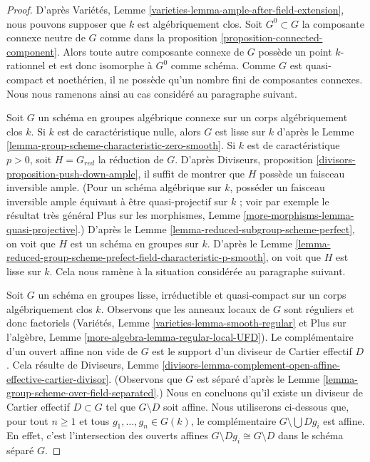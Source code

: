 \begin{proof}
D'après Variétés, Lemme \ref{varieties-lemma-ample-after-field-extension},
nous pouvons supposer que $k$ est algébriquement clos. Soit $G^0 \subset G$
la composante connexe neutre de $G$ comme dans la
proposition \ref{proposition-connected-component}.
Alors toute autre composante connexe de $G$ possède un point $k$-rationnel
et est donc isomorphe à $G^0$ comme schéma.
Comme $G$ est quasi-compact et noethérien, il ne possède qu'un nombre fini de
composantes connexes. Nous nous ramenons ainsi au cas considéré au
paragraphe suivant.

\medskip\noindent
Soit $G$ un schéma en groupes algébrique connexe sur un corps algébriquement clos
$k$. Si $k$ est de caractéristique nulle, alors $G$ est lisse sur
$k$ d'après le Lemme \ref{lemma-group-scheme-characteristic-zero-smooth}.
Si $k$ est de caractéristique $p > 0$, soit $H = G_{red}$
la réduction de $G$. D'après
Diviseurs, proposition \ref{divisors-proposition-push-down-ample},
il suffit de montrer que $H$ possède un faisceau inversible ample.
(Pour un schéma algébrique sur $k$, posséder un faisceau inversible
ample équivaut à être quasi-projectif sur $k$ ; voir
par exemple le résultat très général
Plus sur les morphismes, Lemme \ref{more-morphisms-lemma-quasi-projective}.)
D'après le Lemme \ref{lemma-reduced-subgroup-scheme-perfect},
on voit que $H$ est un schéma en groupes sur $k$.
D'après le Lemme \ref{lemma-reduced-group-scheme-prefect-field-characteristic-p-smooth},
on voit que $H$ est lisse sur $k$.
Cela nous ramène à la situation considérée au
paragraphe suivant.

\medskip\noindent
Soit $G$ un schéma en groupes lisse, irréductible et quasi-compact sur un
corps algébriquement clos $k$. Observons que les anneaux locaux de $G$
sont réguliers et donc factoriels
(Variétés, Lemme \ref{varieties-lemma-smooth-regular} et
Plus sur l'algèbre, Lemme \ref{more-algebra-lemma-regular-local-UFD}).
Le complémentaire d'un ouvert affine non vide de $G$
est le support d'un diviseur de Cartier effectif $D$.
Cela résulte de Diviseurs, Lemme
\ref{divisors-lemma-complement-open-affine-effective-cartier-divisor}.
(Observons que $G$ est séparé d'après le
Lemme \ref{lemma-group-scheme-over-field-separated}.)
Nous en concluons qu'il existe un diviseur de Cartier effectif $D \subset G$
tel que $G \setminus D$ soit affine. Nous utiliserons ci-dessous que,
pour tout $n \geq 1$ et tous $g_1, \ldots, g_n \in G(k)$, le complémentaire
$G \setminus \bigcup D g_i$ est affine. En effet, c'est l'intersection
des ouverts affines $G \setminus Dg_i \cong G \setminus D$
dans le schéma séparé $G$.


\end{proof}
